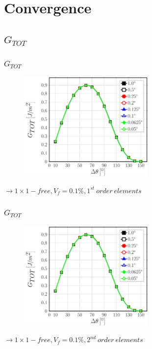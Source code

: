 \documentclass[first,firstsupp,lastsupp,last,hyperref,table]{ETHclass}
\begin{document}
\section{Convergence}

\subsection{$G_{TOT}$}

\begin{frame}
\frametitle{\vspace{0.25cm}\small $G_{TOT}$}
\vspace{-.75cm}
\centering
\begin{figure}
\centering
\includegraphics[width=0.6\textwidth]{Vf0_1-free-1st-GTOT.pdf}
\end{figure}
$\rightarrow 1\times1-free, V_{f}=0.1\%, 1^{st}\ order\ elements$ 
\end{frame}

\addtocounter{framenumber}{-1}

\begin{frame}
\frametitle{\vspace{0.25cm}\small $G_{TOT}$}
\vspace{-.75cm}
\centering
\begin{figure}
\centering
\includegraphics[width=0.6\textwidth]{Vf0_1-free-2nd-GTOT.pdf}
\end{figure}
$\rightarrow 1\times1-free, V_{f}=0.1\%, 2^{nd}\ order\ elements$ 
\end{frame}
\end{document}
